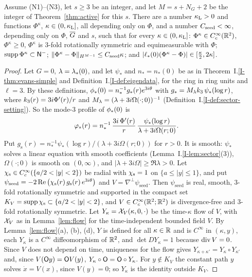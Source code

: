\begin{lemma}
\label{lem:seed}
Assume \textup{(N1)}--\textup{(N3)}, let $s\ge3$ be an integer, and let
$M=s+N_G+2$ be the integer of Theorem~\ref{thm:active} for this $s$. There are a
number $\kappa_{\mathrm{L}}>0$ and functions $\Phi^\kappa$, $\kappa\in(0,\kappa_{\mathrm{L}}]$, all depending only
on $\Phi$, and a number $C_{\mathrm{seed}}<\infty$, depending only on $\Phi$, $\overline{G}$ and $s$,
such that for every
$\kappa\in(0,\kappa_{\mathrm{L}}]$: $\Phi^\kappa\in C_c^\infty(\mathbb{R}^2)$, $\Phi^\kappa\ge0$,
$\Phi^\kappa$ is $3$-fold rotationally symmetric and equimeasurable with $\Phi$;
$\operatorname{supp}\Phi^\kappa\subset\mathsf{N}^{-}$;
$\|\Phi^\kappa-\Phi\|_{H^{M-1}}\le C_{\mathrm{seed}}\kappa$;
and $|\ell_*(0)(\Phi^\kappa-\Phi)|\in[\frac\kappa2,2\kappa]$.
\end{lemma}
\begin{proof}
Let $G=0$, $\lambda=\lambda_*(0)$, and let $\psi_*$ and $n_*=n_*(0)$ be
as in Theorem~I.\ref{I-thm:evans-simple} and Definition~I.\ref{I-def:eigendata}, for the
ring in ring units and $\ell=3$. By these definitions,
$\phi_*(0)=n_*^{-1}g_*(r)e^{3i\theta}$ with $g_*=M_{\lambda}k_3\,\psi_*(\log r)$,
where $k_3(r)=3i\Phi'(r)/r$ and $M_\lambda=(\lambda+3i\Omega(\cdot;0))^{-1}$
(Definition~I.\ref{I-def:sector-setting}). So the mode-$3$ profile of
$\phi_*(0)$ is
\[
\varphi_*(r)=n_*^{-1}\,\frac{3i\,\Phi'(r)}{r}\,\frac{\psi_*(\log r)}{\lambda+3i\Omega(r;0)} .
\]
Put $g_{\mathrm s}(r)=n_*^{-1}\psi_*(\log r)/(\lambda+3i\Omega(r;0))$ for $r>0$. It is
smooth: $\psi_*$ solves a linear equation with smooth coefficients
(Lemma~I.\ref{I-lem:sector}\textup{(3)}), $\Omega(\cdot;0)$ is smooth on $(0,\infty)$, and
$|\lambda+3i\Omega|\ge\Re\lambda>0$. Let $\chiseed\in C_c^\infty(\{a/2<|y|<2\})$ be
radial with $\chi_{\mathrm{s}}=1$ on $\{a\le|y|\le1\}$, and put
$\psi_{\mathrm{seed}}=-2\Re\big(\chi_{\mathrm{s}}(r)\,g_{\mathrm s}(r)\,e^{3i\theta}\big)$ and
$V=\nabla^\perp\psi_{\mathrm{seed}}$. Then $\psi_{\mathrm{seed}}$ is real, smooth,
$3$-fold rotationally symmetric and supported in the compact set
$K_V=\supp\chiseed\subset\{a/2<|y|<2\}$, and $V\in C_c^\infty(\mathbb{R}^2;\mathbb{R}^2)$ is
divergence-free and $3$-fold rotationally symmetric. Let $Y_\kappa=\mathcal{X}_V(\kappa,0,\cdot)$ be the
time-$\kappa$ flow of $V$, with $\mathcal{X}_V$ as in Lemma~\ref{lem:flow} for the
time-independent bounded field $V$. By Lemma~\ref{lem:flow}\textup{(a)}, \textup{(b)},
\textup{(d)}, $Y$ is defined for all $\kappa\in\mathbb{R}$ and is $C^\infty$ in $(\kappa,y)$,
each $Y_\kappa$ is a $C^\infty$ diffeomorphism of $\mathbb{R}^2$, and $\det DY_\kappa=1$
because $\operatorname{div} V=0$. Since $V$ does not depend on time, uniqueness for the flow
gives $Y_{\kappa+\kappa'}=Y_\kappa\circ Y_{\kappa'}$ and, since
$V(\mathsf{O} y)=\mathsf{O} V(y)$, $Y_\kappa\circ\mathsf{O}=\mathsf{O}\circ Y_\kappa$. For $y\notin K_V$
the constant path $y$ solves $\dot x=V(x)$, since $V(y)=0$; so $Y_\kappa$ is the identity outside
$K_V$.


\end{proof}
